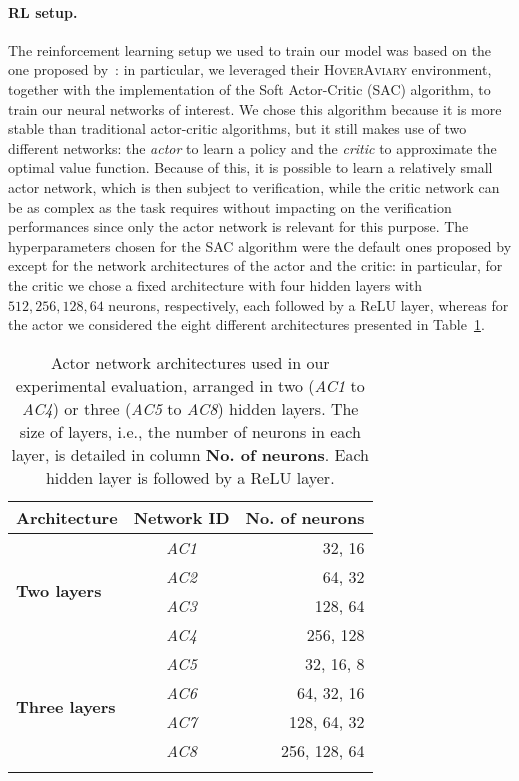 \paragraph{RL setup.} The reinforcement learning setup we used to train 
our model was based on the one proposed by~\cite{DBLP:conf/iros/PaneratiZZXPS21}: 
in particular, we leveraged their \textsc{HoverAviary} environment, together with 
the \stableb{} implementation of the Soft Actor-Critic (SAC) algorithm,
to train our neural networks of interest. We chose this algorithm because
it is more stable than traditional actor-critic algorithms, but it still makes
use of two different networks: the \textit{actor} to learn a
policy and the \textit{critic} to approximate the optimal value
function. Because of this, it is possible to learn a relatively small
actor network, which is then subject to verification, while the critic
network can be as complex as the task requires without impacting on
the verification performances since only the actor network is relevant
for this purpose. 
The hyperparameters chosen for the SAC algorithm were the default ones proposed 
by \stableb{} except for the network architectures of the actor and the critic: 
in particular, for the critic we chose a fixed architecture with four hidden layers 
with $512, 256, 128, 64$ neurons, respectively, each followed by a ReLU layer, 
whereas for the actor we considered the eight different architectures presented in
Table~\ref{tab:ac-arch}.
%
\begin{table}[t]
	\caption{\label{tab:ac-arch}Actor network architectures used in our 
		experimental evaluation, arranged in two (\textit{AC1} to \textit{AC4}) 
		or three (\textit{AC5} to \textit{AC8}) hidden layers. The size of layers, 
		i.e., the number of neurons in each layer, is detailed in column 
		\textbf{No. of neurons}. Each hidden layer is followed by a ReLU layer.}
	\setlength{\tabcolsep}{15.5pt}
	\centering
	\begin{tabular}{l c r}
		\toprule
		\textbf{Architecture} & \textbf{Network ID} & \textbf{No. of neurons} \\
		\midrule
		\multirow{4}{*}{\textbf{Two layers}} & \textit{AC1} & 32, 16 \\
		& \textit{AC2} & 64, 32 \\
		& \textit{AC3} & 128, 64 \\
		& \textit{AC4} & 256, 128 \\
		\midrule
		\multirow{4}{*}{\textbf{Three layers}} & \textit{AC5} & 32, 16, 8 \\
		& \textit{AC6} & 64, 32, 16 \\
		& \textit{AC7} & 128, 64, 32 \\
		& \textit{AC8} & 256, 128, 64 \\
		\bottomrule
		\bigskip
	\end{tabular}
\end{table}

